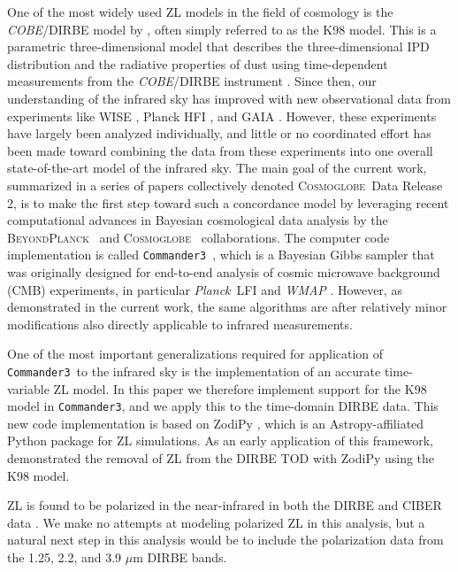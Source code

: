 \documentclass[twocolumn]{aa}
\def\commanderthree{\texttt{Commander3}}
\def\Planck{\textit{Planck}}
\def\WMAP{\textit{WMAP}}
\newcommand{\BP}{\textsc{BeyondPlanck}}
\newcommand{\cosmoglobe}{\textsc{Cosmoglobe}}
\begin{document}
One of the most widely used ZL models in the field of cosmology is the
\textit{COBE}/DIRBE model by \citet{Kelsall1998}, often simply
referred to as the K98 model. This is a parametric three-dimensional
model that describes the three-dimensional IPD distribution and the
radiative properties of dust using time-dependent measurements from
the \textit{COBE}/DIRBE instrument \citep{hauser1998}. Since then, our
understanding of the infrared sky has improved with new observational
data from experiments like WISE \citep{wright:2010}, Planck HFI
\citep{planck2016-l03}, and GAIA \citep{gaia:2016}. However, these
experiments have largely been analyzed individually, and little or no
coordinated effort has been made toward combining the data from these
experiments into one overall state-of-the-art model of the infrared
sky. The main goal of the current work, summarized in a series of
papers collectively denoted \cosmoglobe\ Data Release 2, is to make
the first step toward such a concordance model by leveraging recent
computational advances in Bayesian cosmological data analysis by the
\BP\ \citep[][and references therein]{BP2023,Galloway2023} and
\cosmoglobe\ \citep{Watts2023} collaborations. The computer code
implementation is called \commanderthree\ \citep{Galloway2023}, which
is a Bayesian Gibbs sampler that was originally designed for
end-to-end analysis of cosmic microwave background (CMB) experiments,
in particular \Planck\ LFI \citep{planck2016-l02} and \WMAP
\citep{bennett2012}. However, as demonstrated in the current work, the
same algorithms are after relatively minor modifications also directly
applicable to infrared measurements.

One of the most important generalizations required for application of
\commanderthree\ to the infrared sky is the implementation of an
accurate time-variable ZL model. In this paper we therefore implement
support for the K98 model in \commanderthree, and we apply this to the
time-domain DIRBE data. This new code implementation is based on ZodiPy 
\citep{San2024}, which is an Astropy-affiliated Python package for ZL 
simulations. As an early application of this framework, \cite{San2022} 
demonstrated the removal of ZL from the DIRBE TOD with ZodiPy using the 
K98 model.

ZL is found to be polarized in the near-infrared in both the DIRBE and 
CIBER data \citep{Takimoto2022,Takimoto2023}. We make no attempts at 
modeling polarized ZL in this analysis, but a natural next step in this 
analysis would be to include the polarization data from the 1.25, 2.2, 
and 3.9 $\mu$m DIRBE bands.
\end{document}
